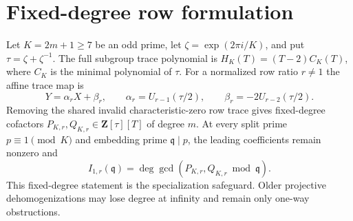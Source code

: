 \section{Fixed-degree row formulation}

Let $K=2m+1\ge7$ be an odd prime, let
$\zeta=\exp(2\pi i/K)$, and put $\tau=\zeta+\zeta^{-1}$. The full subgroup
trace polynomial is $H_K(T)=(T-2)C_K(T)$, where $C_K$ is the minimal
polynomial of $\tau$. For a normalized row ratio $r\ne1$ the affine trace map is
\[
Y=\alpha_rX+\beta_r,\qquad
\alpha_r=U_{r-1}(\tau/2),\qquad\beta_r=-2U_{r-2}(\tau/2).
\]
Removing the shared invalid characteristic-zero row trace gives fixed-degree
cofactors $P_{K,r},Q_{K,r}\in\mathbf Z[\tau][T]$ of degree $m$.
At every split prime $p\equiv1\pmod K$ and embedding prime $\mathfrak q\mid p$,
the leading coefficients remain nonzero and
\begin{equation}\label{frontier:eq:gcd-count}
I_{1,r}(\mathfrak q)=\deg\gcd(P_{K,r},Q_{K,r}\bmod\mathfrak q).
\end{equation}
This fixed-degree statement is the specialization safeguard. Older
projective dehomogenizations may lose degree at infinity and remain only
one-way obstructions.

